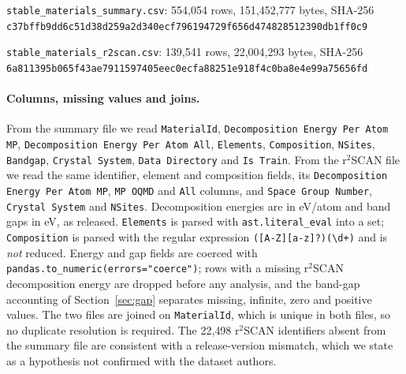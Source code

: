 \documentclass[11pt]{article}
\begin{document}
\noindent\texttt{stable\_materials\_summary.csv}: 554{,}054 rows, 151{,}452{,}777 bytes, SHA-256\\
\texttt{c37bffb9dd6c51d38d259a2d340ecf796194729f656d474828512390db1ff0c9}

\noindent\texttt{stable\_materials\_r2scan.csv}: 139{,}541 rows, 22{,}004{,}293 bytes, SHA-256\\
\texttt{6a811395b065f43ae7911597405eec0ecfa88251e918f4c0ba8e4e99a75656fd}

\paragraph{Columns, missing values and joins.} From the summary file we read
\texttt{MaterialId}, \texttt{Decomposition Energy Per Atom MP}, \texttt{Decomposition
Energy Per Atom All}, \texttt{Elements}, \texttt{Composition}, \texttt{NSites},
\texttt{Bandgap}, \texttt{Crystal System}, \texttt{Data Directory} and \texttt{Is Train}.
From the r$^2$SCAN file we read the same identifier, element and composition fields,
its \texttt{Decomposition Energy Per Atom MP}, \texttt{MP OQMD} and \texttt{All}
columns, and \texttt{Space Group Number}, \texttt{Crystal System} and \texttt{NSites}. Decomposition
energies are in eV/atom and band gaps in eV, as released. \texttt{Elements} is parsed
with \texttt{ast.literal\_eval} into a set; \texttt{Composition} is parsed with the
regular expression \texttt{([A-Z][a-z]?)(\textbackslash d+)} and is \emph{not} reduced.
Energy and gap fields are coerced with \texttt{pandas.to\_numeric(errors="coerce")};
rows with a missing r$^2$SCAN decomposition energy are dropped before any analysis, and
the band-gap accounting of Section~\ref{sec:gap} separates missing, infinite, zero and
positive values. The two files are joined on \texttt{MaterialId}, which is unique in both
files, so no duplicate resolution is required. The 22{,}498 r$^2$SCAN identifiers absent
from the summary file are consistent with a release-version mismatch, which we state as
a hypothesis not confirmed with the dataset authors.
\end{document}
